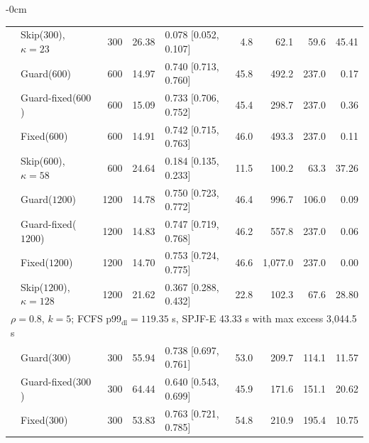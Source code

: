 \documentclass[mathematics,supfile,submit,moreauthors]{Definitions/mdpi}
\newcommand{\devnum}[1]{#1}
\begin{document}
\begin{table}[H]
\begin{adjustwidth}{-\extralength}{0cm}
\begin{tabular}{llrrlrrrr}
 & Skip($\devnum{300}$), $\kappa=23$ & \devnum{300} & \devnum{26.38} & \devnum{0.078 [0.052, 0.107]} & \devnum{4.8} & \devnum{62.1} & \devnum{59.6} & \devnum{45.41} \\
 & Guard($\devnum{600}$)      & \devnum{600} & \devnum{14.97} & \devnum{0.740 [0.713, 0.760]} & \devnum{45.8} & \devnum{492.2} & \devnum{237.0} & \devnum{0.17} \\
 & Guard-fixed($\devnum{600}$) & \devnum{600} & \devnum{15.09} & \devnum{0.733 [0.706, 0.752]} & \devnum{45.4} & \devnum{298.7} & \devnum{237.0} & \devnum{0.36} \\
 & Fixed($\devnum{600}$)      & \devnum{600} & \devnum{14.91} & \devnum{0.742 [0.715, 0.763]} & \devnum{46.0} & \devnum{493.3} & \devnum{237.0} & \devnum{0.11} \\
 & Skip($\devnum{600}$), $\kappa=58$ & \devnum{600} & \devnum{24.64} & \devnum{0.184 [0.135, 0.233]} & \devnum{11.5} & \devnum{100.2} & \devnum{63.3} & \devnum{37.26} \\
 & Guard($\devnum{1200}$)     & \devnum{1200} & \devnum{14.78} & \devnum{0.750 [0.723, 0.772]} & \devnum{46.4} & \devnum{996.7} & \devnum{106.0} & \devnum{0.09} \\
 & Guard-fixed($\devnum{1200}$) & \devnum{1200} & \devnum{14.83} & \devnum{0.747 [0.719, 0.768]} & \devnum{46.2} & \devnum{557.8} & \devnum{237.0} & \devnum{0.06} \\
 & Fixed($\devnum{1200}$)     & \devnum{1200} & \devnum{14.70} & \devnum{0.753 [0.724, 0.775]} & \devnum{46.6} & \devnum{1{,}077.0} & \devnum{237.0} & \devnum{0.00} \\
 & Skip($\devnum{1200}$), $\kappa=128$ & \devnum{1200} & \devnum{21.62} & \devnum{0.367 [0.288, 0.432]} & \devnum{22.8} & \devnum{102.3} & \devnum{67.6} & \devnum{28.80} \\
\midrule
\multicolumn{9}{l}{$\rho = \devnum{0.8}$, $k = \devnum{5}$; FCFS p99$_{\mathrm{dl}} = \devnum{119.35}$ s, SPJF-E \devnum{43.33} s with max excess \devnum{3{,}044.5} s} \\
 & Guard($\devnum{300}$)      & \devnum{300} & \devnum{55.94} & \devnum{0.738 [0.697, 0.761]} & \devnum{53.0} & \devnum{209.7} & \devnum{114.1} & \devnum{11.57} \\
 & Guard-fixed($\devnum{300}$) & \devnum{300} & \devnum{64.44} & \devnum{0.640 [0.543, 0.699]} & \devnum{45.9} & \devnum{171.6} & \devnum{151.1} & \devnum{20.62} \\
 & Fixed($\devnum{300}$)      & \devnum{300} & \devnum{53.83} & \devnum{0.763 [0.721, 0.785]} & \devnum{54.8} & \devnum{210.9} & \devnum{195.4} & \devnum{10.75} \\

\end{tabular}
\end{adjustwidth}
\end{table}
\end{document}
